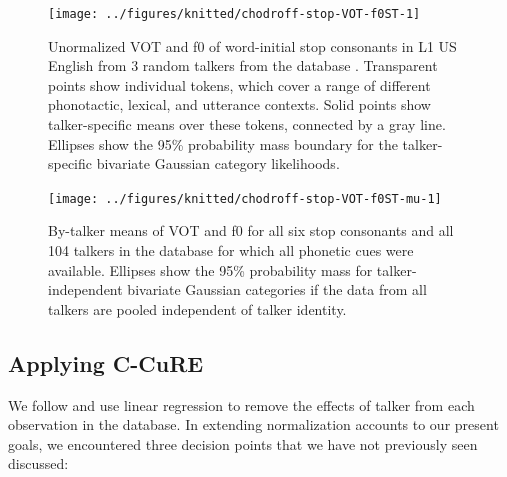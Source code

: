 \documentclass[
  11pt,
  man,floatsintext]{apa6}
\begin{document}
\begin{figure}

{\centering \texttt{[image: ../figures/knitted/chodroff-stop-VOT-f0ST-1]} 

}

\caption{Unormalized VOT and f0 of word-initial stop consonants in L1 US English from 3 random talkers from the database \autocite{chodroff-wilson2018}. Transparent points show individual tokens, which cover a range of different phonotactic, lexical, and utterance contexts. Solid points show talker-specific means over these tokens, connected by a gray line. Ellipses show the 95\% probability mass boundary for the talker-specific bivariate Gaussian category likelihoods.}\label{fig:chodroff-stop-VOT-f0ST}
\end{figure}



\begin{figure}

{\centering \texttt{[image: ../figures/knitted/chodroff-stop-VOT-f0ST-mu-1]} 

}

\caption{By-talker means of VOT and f0 for all six stop consonants and all 104 talkers in the database \autocite{chodroff-wilson2018} for which all phonetic cues were available. Ellipses show the 95\% probability mass for talker-independent bivariate Gaussian categories if the data from all talkers are pooled independent of talker identity.}\label{fig:chodroff-stop-VOT-f0ST-mu}
\end{figure}

\subsection{Applying C-CuRE}\label{sec:SI-applying-C-CuRE}

We follow \textcite{mcmurray-jongman2011} and use linear regression to remove the effects of talker from each observation in the database. In extending normalization accounts to our present goals, we encountered three decision points that we have not previously seen discussed:
\end{document}
